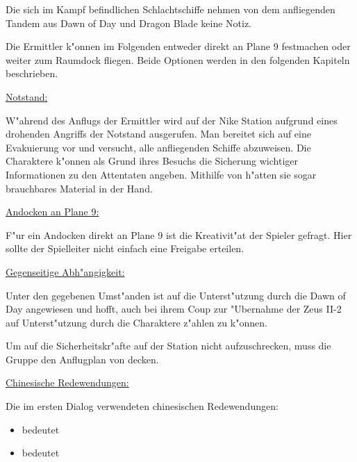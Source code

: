 Die sich im Kampf befindlichen Schlachtschiffe nehmen von dem anfliegenden Tandem aus Dawn of Day und Dragon Blade keine Notiz.

\begin{remarks}
	Die Ermittler k"onnen im Folgenden entweder direkt an Plane 9 festmachen oder weiter zum Raumdock fliegen. Beide Optionen werden in den folgenden Kapiteln beschrieben.

	\underline{Notstand:}

	W"ahrend des Anflugs der Ermittler wird auf der Nike Station aufgrund eines drohenden Angriffs der Notstand ausgerufen. Man bereitet sich auf eine Evakuierung vor und versucht, alle anfliegenden Schiffe abzuweisen. Die Charaktere k"onnen als Grund ihres Besuchs die Sicherung wichtiger Informationen zu den Attentaten angeben. Mithilfe von \ml{} h"atten sie sogar brauchbares Material in der Hand.

	\underline{Andocken an Plane 9:}
	
	F"ur ein Andocken direkt an Plane 9 ist die Kreativit"at der Spieler gefragt. Hier sollte der Spielleiter nicht einfach eine Freigabe erteilen.

	\underline{Gegenseitige Abh"angigkeit:}

	Unter den gegebenen Umst"anden ist \xl{} auf die Unterst"utzung durch die Dawn of Day angewiesen und hofft, auch bei ihrem Coup zur "Ubernahme der Zeus II-2 auf Unterst"utzung durch die Charaktere z"ahlen zu k"onnen. 
	
	Um auf die Sicherheitskr"afte auf der Station nicht aufzuschrecken, muss die Gruppe den Anflugplan von \xl{} decken.

	\underline{Chinesische Redewendungen:}

	Die im ersten Dialog verwendeten chinesischen Redewendungen:
	
	\begin{itemize}
		\item {} bedeutet 
		\item {} bedeutet 
	\end{itemize}
\end{remarks}
\vfill
\pagebreak